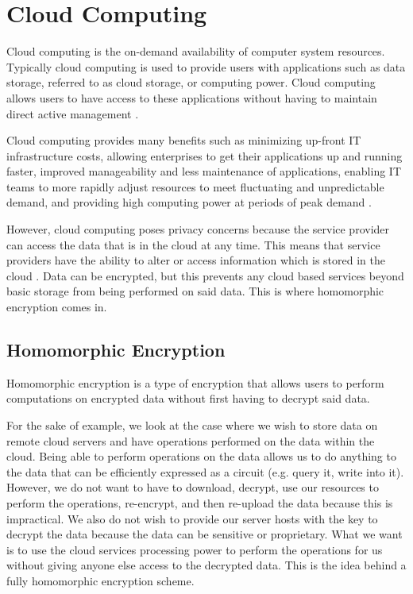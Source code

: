 \section{Cloud Computing}

Cloud computing is the on-demand availability of computer system resources. Typically cloud computing is used to provide users with applications such as data storage, referred to as cloud storage, or computing power. Cloud computing allows users to have access to these applications without having to maintain direct active management \cite{cloud2020}.

Cloud computing provides many benefits such as minimizing up-front IT infrastructure costs, allowing enterprises to get their applications up and running faster, improved manageability and less maintenance of applications, enabling IT teams to more rapidly adjust resources to meet fluctuating and unpredictable demand, and providing high computing power at periods of peak demand \cite{simpson}.

However, cloud computing poses privacy concerns because the service provider can access the data that is in the cloud at any time. This means that service providers have the ability to alter or access information which is stored in the cloud \cite{ryan}. Data can be encrypted, but this prevents any cloud based services beyond basic storage from being performed on said data. This is where homomorphic encryption comes in.

\subsection{Homomorphic Encryption}

Homomorphic encryption is a type of encryption that allows users to perform computations on encrypted data without first having to decrypt said data.

For the sake of example, we look at the case where we wish to store data on remote cloud servers and have operations performed on the data within the cloud. Being able to perform operations on the data allows us to do anything to the data that can be efficiently expressed as a circuit (e.g. query it, write into it). However, we do not want to have to download, decrypt, use our resources to perform the operations, re-encrypt, and then re-upload the data because this is impractical. We also do not wish to provide our server hosts with the key to decrypt the data because the data can be sensitive or proprietary. What we want is to use the cloud services processing power to perform the operations for us without giving anyone else access to the decrypted data. This is the idea behind a fully homomorphic encryption scheme.

